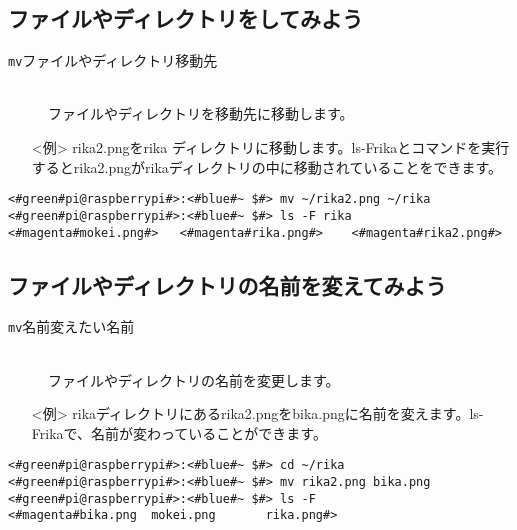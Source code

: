 \subsection{ファイルやディレクトリをしてみよう}
\begin{description}
\item[\texttt{mv}\textvisiblespace ファイルやディレクトリ\textvisiblespace 移動先]\mbox{}\\
ファイルやディレクトリを移動先に移動します。
\end{description}
\begin{itemize}
\item[<例>]rika2.pngをrika ディレクトリに移動します。ls\textvisiblespace -F\textvisiblespace rikaとコマンドを実行するとrika2.pngがrikaディレクトリの中に移動されていることをできます。
\end{itemize}
\begin{lstlisting}[caption=mvの例, label=mv]
<#green#pi@raspberrypi#>:<#blue#~ $#> mv ~/rika2.png ~/rika
<#green#pi@raspberrypi#>:<#blue#~ $#> ls -F rika
<#magenta#mokei.png#>	<#magenta#rika.png#>	<#magenta#rika2.png#>
\end{lstlisting}


\subsection{ファイルやディレクトリの名前を変えてみよう}
\begin{description}
\item[\texttt{mv}\textvisiblespace 名前\textvisiblespace 変えたい名前]\mbox{}\\
ファイルやディレクトリの名前を変更します。
\end{description}
\begin{itemize}
\item[<例>]rikaディレクトリにあるrika2.pngをbika.pngに名前を変えます。ls\textvisiblespace -F\textvisiblespace rikaで、名前が変わっていることができます。
\end{itemize}
\begin{lstlisting}[caption=mvNameの例, label=mvName]
<#green#pi@raspberrypi#>:<#blue#~ $#> cd ~/rika
<#green#pi@raspberrypi#>:<#blue#~ $#> mv rika2.png bika.png
<#green#pi@raspberrypi#>:<#blue#~ $#> ls -F
<#magenta#bika.png	mokei.png		rika.png#>
\end{lstlisting}

